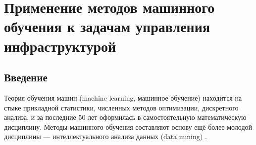 \chapter{Применение методов машинного обучения к задачам управления инфраструктурой} \label{chapt1}

\section{Введение}

Теория обучения машин (machine learning, машинное обучение) находится на стыке прикладной статистики, численных методов оптимизации, дискретного анализа, и за последние 50 лет оформилась в самостоятельную математическую дисциплину. Методы машинного обучения составляют основу ещё более молодой дисциплины — интеллектуального анализа данных (data mining) \cite{воронцов2009машинное, marsland2015machineconway2012machine}.

